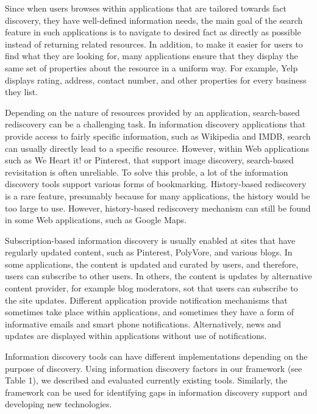 \documentclass{casconpaper}
\begin{document}
{Since when users browses within applications that are tailored towards fact discovery, they have well-defined information needs, the main goal of the search feature in such applications is to navigate to desired fact as directly as possible instead of returning related resources. In addition, to make it easier for users to find what they are looking for, many applications ensure that they display the same set of properties about the resource in a uniform way. For example, Yelp displays rating, address, contact number, and other properties for every business they list.

Depending on the nature of resources provided by an application, search-based rediscovery can be a challenging task. In information discovery applications that provide access to fairly specific information, such as Wikipedia and IMDB, search can usually directly lead to a specific resource. However, within Web applications such as We Heart it! or Pinterest, that support image discovery, search-based revisitation is often unreliable. To solve this proble, a lot of the information discovery tools support various forms of bookmarking. History-based rediscovery is a rare feature, presumably because for many applications, the history would be too large to use. However, history-based rediscovery mechanism can still be found in some Web applications, such as Google Maps.

Subscription-based information discovery is usually enabled at sites that have regularly updated content, such as Pinterest, PolyVore, and various blogs. In some applications, the content is updated and curated by users, and therefore, users can subscribe to other users. In others, the content is updates by alternative content provider, for example blog moderators, sot that users can subscribe to the site updates. Different application provide notification mechanisms that sometimes take place within applications, and sometimes they have a form of informative emails and smart phone notifications. Alternatively, news and updates are displayed within applications without use of notifications.

Information discovery tools can have different implementations depending on the purpose of discovery. Using information discovery factors in our framework (see Table 1), we described and evaluated currently existing tools. Similarly, the framework can be used for identifying gaps in information discovery support and developing new technologies.   \\

}
\end{document}
